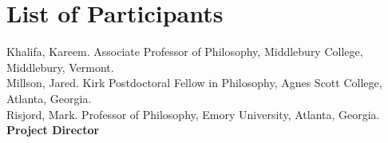 \documentclass{article}[11pt]
\begin{document}





\clearpage


\section{List of Participants}

\noindent Khalifa, Kareem. Associate Professor of Philosophy, Middlebury College, Middlebury, Vermont.  \\[12pt]

\noindent Millson, Jared. Kirk Postdoctoral Fellow in Philosophy, Agnes Scott College, Atlanta, Georgia.  \\[12pt]

\noindent Risjord, Mark. Professor of Philosophy, Emory University, Atlanta, Georgia. \textbf{Project Director}  

\clearpage


\end{document}
